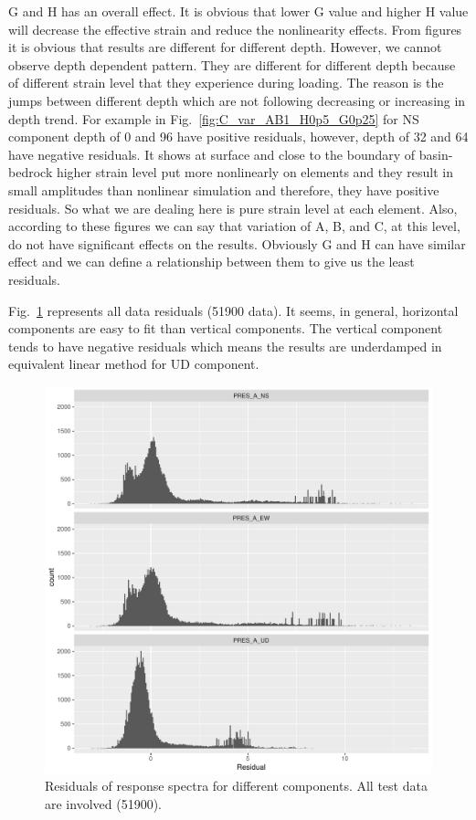 G and H has an overall effect. It is obvious that lower G value and higher H value will decrease the effective strain and reduce the nonlinearity effects. From figures it is obvious that results are different for different depth. However, we cannot observe depth dependent pattern. They are different for different depth because of different strain level that they experience during loading. The reason is the jumps between different depth which are not following decreasing or increasing in depth trend. For example in Fig.~\ref{fig:C_var_AB1_H0p5_G0p25} for NS component depth of 0 and 96 have positive residuals, however, depth of 32 and 64 have negative residuals. It shows at surface and close to the boundary of basin-bedrock higher strain level put more nonlinearly on elements and they result in small amplitudes than nonlinear simulation and therefore, they have positive residuals. So what we are dealing here is pure strain level at each element.  Also, according to these figures we can say that variation of A, B, and C, at this level, do not have significant effects on the results.  Obviously G and H can have similar effect and we can define a relationship between them to give us the least residuals. 

Fig.~\ref{fig:all_data_residulas_response} represents all data residuals (51900 data). It seems, in general, horizontal components are easy to fit than vertical components. The vertical component tends to have negative residuals which means the results are underdamped in equivalent linear method for UD component. 

 \begin{figure}[H]
    \centering
    \includegraphics[width=\textwidth]{figures/pdf/all_data_residulas_response.pdf}
    \caption{Residuals of response spectra for different components. All test data are involved (51900).}
    \label{fig:all_data_residulas_response}
\end{figure}

